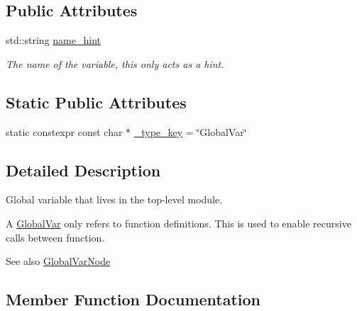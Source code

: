 \subsection*{Public Attributes}
\begin{DoxyCompactItemize}
\item 
std\+::string \hyperlink{classtvm_1_1GlobalVarNode_a0db816494d9c003bea73bcc23b7ba0de}{name\+\_\+hint}
\begin{DoxyCompactList}\small\item\em The name of the variable, this only acts as a hint. \end{DoxyCompactList}\end{DoxyCompactItemize}
\subsection*{Static Public Attributes}
\begin{DoxyCompactItemize}
\item 
static constexpr const char $\ast$ \hyperlink{classtvm_1_1GlobalVarNode_a98aaa2e17f5e8b5b0ea52f5b156e0caf}{\+\_\+type\+\_\+key} = \char`\"{}Global\+Var\char`\"{}
\end{DoxyCompactItemize}


\subsection{Detailed Description}
Global variable that lives in the top-\/level module. 

A \hyperlink{classtvm_1_1GlobalVar}{Global\+Var} only refers to function definitions. This is used to enable recursive calls between function.

\begin{DoxySeeAlso}{See also}
\hyperlink{classtvm_1_1GlobalVarNode}{Global\+Var\+Node} 
\end{DoxySeeAlso}


\subsection{Member Function Documentation}
